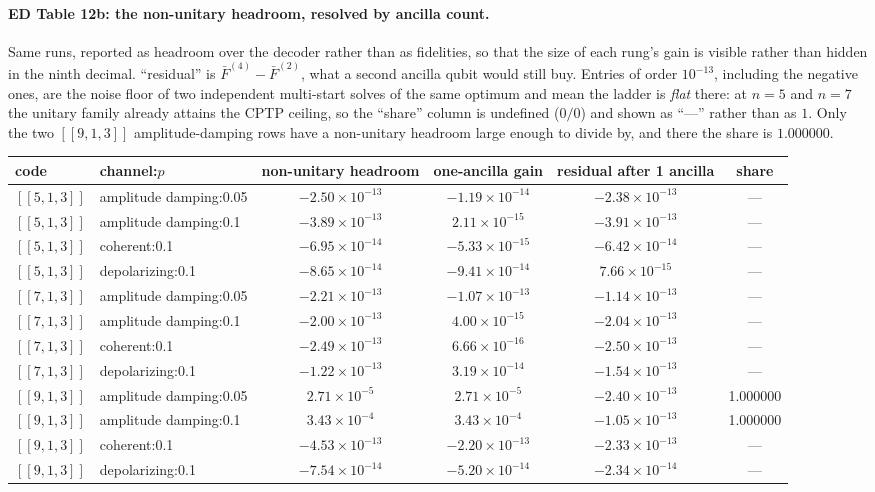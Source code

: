 \documentclass[10pt,a4paper]{article}
\begin{document}
\paragraph*{ED Table 12b: the non-unitary headroom, resolved by ancilla count.}
Same runs, reported as headroom over the decoder rather than as fidelities, so
that the size of each rung's gain is visible rather than hidden in the ninth
decimal.  ``residual'' is $\bar F^{(4)}-\bar F^{(2)}$, what a second ancilla
qubit would still buy.  Entries of order $10^{-13}$, including the negative ones,
are the noise floor of two independent multi-start solves of the same optimum and
mean the ladder is \emph{flat} there: at $n=5$ and $n=7$ the unitary family already
attains the CPTP ceiling, so the ``share'' column is undefined ($0/0$) and shown as
``---'' rather than as $1$.  Only the two $[\![9,1,3]\!]$ amplitude-damping rows
have a non-unitary headroom large enough to divide by, and there the share is
$1.000000$.

\begin{longtable}{llcccc}
\toprule code & channel:$p$ & non-unitary headroom & one-ancilla gain & residual after 1 ancilla & share \\ \midrule
$[\![5,1,3]\!]$ & amplitude damping:0.05 & $-2.50\times 10^{-13}$ & $-1.19\times 10^{-14}$ & $-2.38\times 10^{-13}$ & --- \\
$[\![5,1,3]\!]$ & amplitude damping:0.1 & $-3.89\times 10^{-13}$ & $2.11\times 10^{-15}$ & $-3.91\times 10^{-13}$ & --- \\
$[\![5,1,3]\!]$ & coherent:0.1 & $-6.95\times 10^{-14}$ & $-5.33\times 10^{-15}$ & $-6.42\times 10^{-14}$ & --- \\
$[\![5,1,3]\!]$ & depolarizing:0.1 & $-8.65\times 10^{-14}$ & $-9.41\times 10^{-14}$ & $7.66\times 10^{-15}$ & --- \\
$[\![7,1,3]\!]$ & amplitude damping:0.05 & $-2.21\times 10^{-13}$ & $-1.07\times 10^{-13}$ & $-1.14\times 10^{-13}$ & --- \\
$[\![7,1,3]\!]$ & amplitude damping:0.1 & $-2.00\times 10^{-13}$ & $4.00\times 10^{-15}$ & $-2.04\times 10^{-13}$ & --- \\
$[\![7,1,3]\!]$ & coherent:0.1 & $-2.49\times 10^{-13}$ & $6.66\times 10^{-16}$ & $-2.50\times 10^{-13}$ & --- \\
$[\![7,1,3]\!]$ & depolarizing:0.1 & $-1.22\times 10^{-13}$ & $3.19\times 10^{-14}$ & $-1.54\times 10^{-13}$ & --- \\
$[\![9,1,3]\!]$ & amplitude damping:0.05 & $2.71\times 10^{-5}$ & $2.71\times 10^{-5}$ & $-2.40\times 10^{-13}$ & 1.000000 \\
$[\![9,1,3]\!]$ & amplitude damping:0.1 & $3.43\times 10^{-4}$ & $3.43\times 10^{-4}$ & $-1.05\times 10^{-13}$ & 1.000000 \\
$[\![9,1,3]\!]$ & coherent:0.1 & $-4.53\times 10^{-13}$ & $-2.20\times 10^{-13}$ & $-2.33\times 10^{-13}$ & --- \\
$[\![9,1,3]\!]$ & depolarizing:0.1 & $-7.54\times 10^{-14}$ & $-5.20\times 10^{-14}$ & $-2.34\times 10^{-14}$ & --- \\
\bottomrule\end{longtable}
\end{document}
